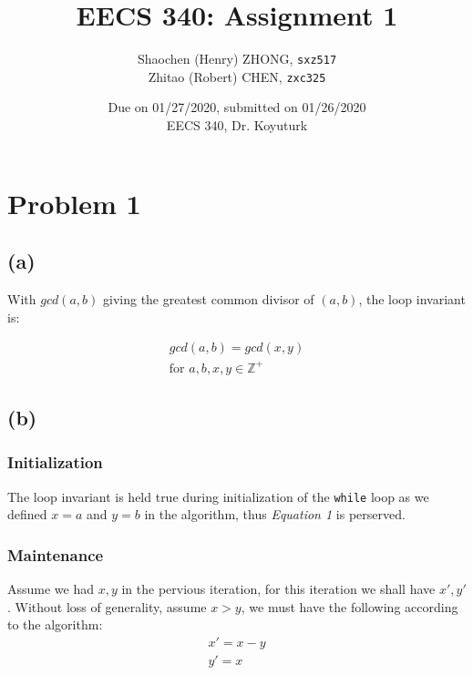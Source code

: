 \documentclass[12pt]{article}
\newcommand{\inlinecode}{\texttt}
\begin{document}
\title{\textbf{EECS 340: Assignment 1}}

\author{Shaochen (Henry) ZHONG, \inlinecode{sxz517} \\ Zhitao (Robert) CHEN, \inlinecode{zxc325}}
\date{Due on 01/27/2020, submitted on 01/26/2020 \\ EECS 340, Dr. Koyuturk}
\maketitle

\section{Problem 1}
\subsection{(a)}
With $gcd(a, b)$ giving the greatest common divisor of $(a, b)$, the loop invariant is:

\begin{gather}
    gcd(a, b) = gcd(x, y) \\
    \text{for $a, b, x, y \in \mathbb{Z^+}$}\nonumber
\end{gather}




\subsection{(b)}
\subsubsection{Initialization}

The loop invariant is held true during initialization of the \inlinecode{while} loop as we defined $x = a$ and $y = b$ in the algorithm, thus \textit{Equation 1} is perserved.

\subsubsection{Maintenance}

Assume we had $x, y$ in the pervious iteration, for this iteration we shall have $x', y'$. Without loss of generality, assume $x > y$, we must have the following according to the algorithm:
\begin{gather}
    x' = x - y \nonumber\\
    y' = x \nonumber
\end{gather}
\end{document}
